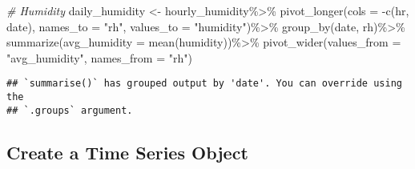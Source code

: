 \documentclass[
]{article}
\newenvironment{Shaded}{\begin{snugshade}}{\end{snugshade}}
\newcommand{\AttributeTok}[1]{\textcolor[rgb]{0.77,0.63,0.00}{#1}}
\newcommand{\CommentTok}[1]{\textcolor[rgb]{0.56,0.35,0.01}{\textit{#1}}}
\newcommand{\FunctionTok}[1]{\textcolor[rgb]{0.00,0.00,0.00}{#1}}
\newcommand{\NormalTok}[1]{#1}
\newcommand{\OtherTok}[1]{\textcolor[rgb]{0.56,0.35,0.01}{#1}}
\newcommand{\SpecialCharTok}[1]{\textcolor[rgb]{0.00,0.00,0.00}{#1}}
\newcommand{\StringTok}[1]{\textcolor[rgb]{0.31,0.60,0.02}{#1}}
\begin{document}
\begin{Shaded}
\begin{Highlighting}[]
\CommentTok{\# Humidity}
\NormalTok{daily\_humidity }\OtherTok{\textless{}{-}}\NormalTok{ hourly\_humidity}\SpecialCharTok{\%\textgreater{}\%}
  \FunctionTok{pivot\_longer}\NormalTok{(}\AttributeTok{cols =} \SpecialCharTok{{-}}\FunctionTok{c}\NormalTok{(hr, date), }\AttributeTok{names\_to =} \StringTok{"rh"}\NormalTok{, }\AttributeTok{values\_to =} \StringTok{"humidity"}\NormalTok{)}\SpecialCharTok{\%\textgreater{}\%}
  \FunctionTok{group\_by}\NormalTok{(date, rh)}\SpecialCharTok{\%\textgreater{}\%}
  \FunctionTok{summarize}\NormalTok{(}\AttributeTok{avg\_humidity =} \FunctionTok{mean}\NormalTok{(humidity))}\SpecialCharTok{\%\textgreater{}\%}
  \FunctionTok{pivot\_wider}\NormalTok{(}\AttributeTok{values\_from =} \StringTok{"avg\_humidity"}\NormalTok{, }\AttributeTok{names\_from =} \StringTok{"rh"}\NormalTok{)}
\end{Highlighting}
\end{Shaded}

\begin{verbatim}
## `summarise()` has grouped output by 'date'. You can override using the
## `.groups` argument.
\end{verbatim}

\begin{Shaded}
\end{Shaded}

\hypertarget{create-a-time-series-object}{%
\subsection{Create a Time Series
Object}\label{create-a-time-series-object}}
\end{document}
